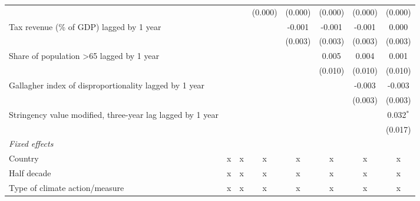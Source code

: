 \begin{tabular}{lccccccc}
                                                                                         &         &         & (0.000) & (0.000)     & (0.000)     & (0.000)     & (0.000)\\   
   Tax revenue (\% of GDP) lagged by 1 year                                              &         &         &         & -0.001      & -0.001      & -0.001      & 0.000\\   
                                                                                         &         &         &         & (0.003)     & (0.003)     & (0.003)     & (0.003)\\   
   Share of population >65 lagged by 1 year                                              &         &         &         &             & 0.005       & 0.004       & 0.001\\   
                                                                                         &         &         &         &             & (0.010)     & (0.010)     & (0.010)\\   
   Gallagher index of disproportionality lagged by 1 year                                &         &         &         &             &             & -0.003      & -0.003\\   
                                                                                         &         &         &         &             &             & (0.003)     & (0.003)\\   
   Stringency value modified, three-year lag lagged by 1 year                            &         &         &         &             &             &             & 0.032$^{*}$\\   
                                                                                         &         &         &         &             &             &             & (0.017)\\   
   \emph{Fixed effects}\\
   Country                                                                               & x       & x       & x       & x           & x           & x           & x\\  
   Half decade                                                                           & x       & x       & x       & x           & x           & x           & x\\  
   Type of climate action/measure                                                        & x       & x       & x       & x           & x           & x           & x\\  

\end{tabular}
